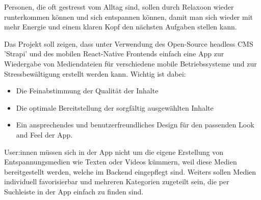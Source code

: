
Personen, die oft gestresst vom Alltag sind, sollen durch Relaxoon wieder runterkommen können
und sich entspannen können, damit man sich wieder mit mehr Energie und einem klaren Kopf den
nächsten Aufgaben stellen kann.

Das Projekt soll zeigen, dass unter Verwendung des Open-Source headless CMS 'Strapi' und des mobilen
React-Native Frontends einfach eine App zur Wiedergabe von Mediendateien für verschiedene mobile Betriebssysteme
und zur Stressbewältigung erstellt werden kann. Wichtig ist dabei: 

\begin{itemize}
    \item Die Feinabstimmung der Qualität der Inhalte
    \item Die optimale Bereitstellung der sorgfältig ausgewählten Inhalte
    \item Ein ansprechendes und benutzerfreundliches Design für den passenden Look and Feel der App.
\end{itemize}

User:innen müssen sich in der App nicht um die eigene Erstellung von Entspannungsmedien wie Texten oder Videos
kümmern, weil diese Medien bereitgestellt werden, welche im Backend eingepflegt sind. Weiters sollen Medien
individuell favorisierbar und mehreren Kategorien zugeteilt sein, die per Suchleiste in der App einfach zu
finden sind.